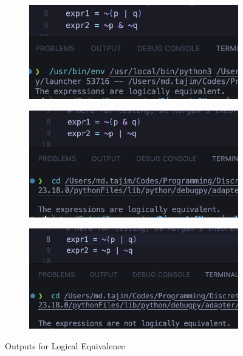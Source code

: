 \begin{figure}[h]
    \begin{subfigure}{.5\textwidth}
        \centering
        \includegraphics[width=.8\linewidth]{images/output/1demorganOR.png}
        \caption*{}
        \label{fig:sfig1}
    \end{subfigure}
    \begin{subfigure}{.5\textwidth}
        \centering
        \includegraphics[width=.8\linewidth]{images/output/2demorganAND.png}
        \caption*{}
        \label{fig:sfig2}
    \end{subfigure}
    \begin{subfigure}{1\textwidth}
        \centering
        \includegraphics[width=.5\linewidth]{images/output/3random.png}
        \caption*{}
        \label{fig:sfig3}
    \end{subfigure}
    \caption{Outputs for Logical Equivalence}
    \label{fig:fig}
\end{figure}